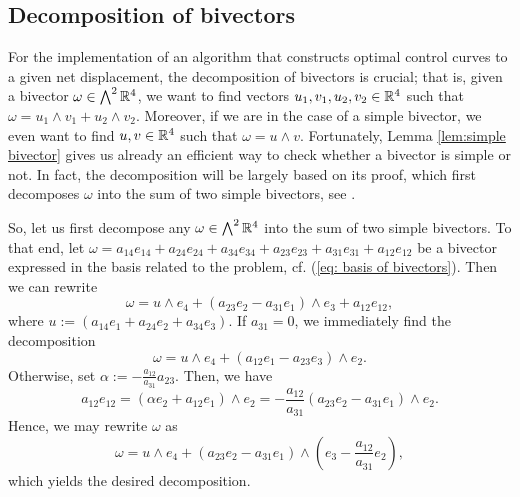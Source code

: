 \subsection{Decomposition of bivectors}
\label{subsec:decomposition}
For the implementation of an algorithm that constructs optimal control curves to a given net displacement, the decomposition of bivectors is crucial; that is, given a bivector $\omega \in \bigwedge^2 \mathbb{R}^4$, we want to find vectors $u_1, v_1, u_2, v_2 \in \mathbb{R}^4$ such that $\omega = u_1 \wedge v_1 + u_2 \wedge v_2$. Moreover, if we are in the case of a simple bivector, we even want to find $u, v \in \mathbb{R}^4$ such that $\omega = u \wedge v$. Fortunately, Lemma \ref{lem:simple bivector} gives us already an efficient way to check whether a bivector is simple or not. In fact, the decomposition will be largely based on its proof, which first decomposes $\omega$ into the sum of two simple bivectors, see \cite{Hitchin2003}.

So, let us first decompose any $\omega \in \bigwedge^2 \mathbb{R}^4$ into the sum of two simple bivectors. To that end, let $\omega = a_{14}e_{14} +  a_{24}e_{24} +  a_{34}e_{34} +  a_{23}e_{23} +  a_{31}e_{31} +  a_{12}e_{12}$ be a bivector expressed in the basis related to the problem, cf. (\ref{eq: basis of bivectors}). Then we can rewrite
\begin{equation}
    \omega = u \wedge e_4 + (a_{23} e_2 - a_{31}e_1) \wedge e_3 + a_{12} e_{12},
\end{equation}
where $u := ( a_{14}e_{1} +  a_{24}e_{2} +  a_{34}e_{3})$. If $a_{31} = 0$, we immediately find the decomposition
\begin{equation}
    \omega = u \wedge e_4 + (a_{12} e_1 - a_{23} e_3) \wedge e_2.
\end{equation}
Otherwise, set $\alpha := - \tfrac{a_{12}}{a_{31}} a_{23}$. Then, we have
\begin{equation}
    a_{12} e_{12} = (\alpha e_2 + a_{12} e_1) \wedge e_2 = - \frac{a_{12}}{a_{31}} (a_{23} e_2 - a_{31} e_1) \wedge e_2.
\end{equation}
Hence, we may rewrite $\omega$ as
\begin{equation}
    \omega = u \wedge e_4 + (a_{23} e_2 - a_{31} e_1) \wedge \left(e_3 - \frac{a_{12}}{a_{31}}e_2 \right), 
\end{equation}
which yields the desired decomposition.

